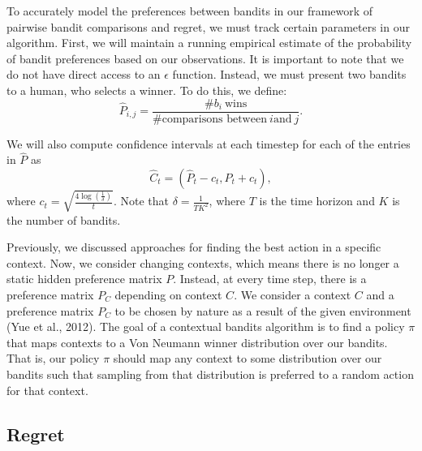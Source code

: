 \documentclass[
  letterpaper,
  numbers=noenddot,
  DIV=11]{scrreprt}
\theoremstyle{plain}
\theoremstyle{definition}
\theoremstyle{plain}
\theoremstyle{remark}
\begin{document}
To accurately model the preferences between bandits in our framework of
pairwise bandit comparisons and regret, we must track certain parameters
in our algorithm. First, we will maintain a running empirical estimate
of the probability of bandit preferences based on our observations. It
is important to note that we do not have direct access to an
\(\epsilon\) function. Instead, we must present two bandits to a human,
who selects a winner. To do this, we define:
\[\hat{P}_{i, j} = \frac{\# b_i\ \text{wins}}{\# \text{comparisons between}\ i \text{and}\ j}.\]

We will also compute confidence intervals at each timestep for each of
the entries in \(\hat{P}\) as
\[\hat{C}_t = \left( \hat{P}_t - c_t, \hat{P}_t + c_t \right),\] where
\(c_t = \sqrt{\frac{4\log(\frac{1}{\delta})}{t}}\). Note that
\(\delta = \frac{1}{TK^2}\), where \(T\) is the time horizon and \(K\)
is the number of bandits.

Previously, we discussed approaches for finding the best action in a
specific context. Now, we consider changing contexts, which means there
is no longer a static hidden preference matrix \(P\). Instead, at every
time step, there is a preference matrix \(P_C\) depending on context
\(C\). We consider a context \(C\) and a preference matrix \(P_C\) to be
chosen by nature as a result of the given environment (Yue et al.,
2012). The goal of a contextual bandits algorithm is to find a policy
\(\pi\) that maps contexts to a Von Neumann winner distribution over our
bandits. That is, our policy \(\pi\) should map any context to some
distribution over our bandits such that sampling from that distribution
is preferred to a random action for that context.

\subsection{Regret}\label{regret}
\end{document}
